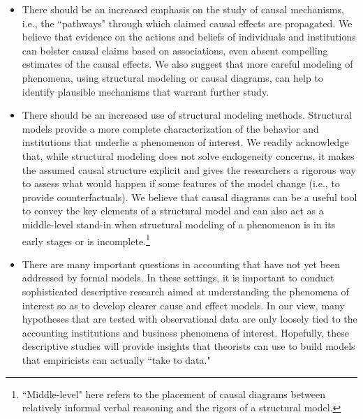 \documentclass[12pt,reqno,titlepage]{amsart}
\begin{document}
\begin{doublespace}
\begin{itemize}
\item There should be an increased emphasis on the study of causal mechanisms, i.e., the ``pathways" through which claimed causal effects are propagated.
We believe that evidence on the actions and beliefs of individuals and institutions can bolster causal claims based on associations, even absent compelling estimates of the causal effects.
We also suggest that more careful modeling of phenomena, using structural modeling or causal diagrams, can help to identify plausible mechanisms that warrant further study.
\item There should be an increased use of structural modeling methods. 
Structural models provide a more complete characterization of the behavior and institutions that underlie a phenomenon of interest.
We readily acknowledge that, while structural modeling does not solve endogeneity concerns, it makes the assumed causal structure explicit and gives the researchers a rigorous way to assess what would happen if some features of the model change (i.e., to provide counterfactuals).
We believe that causal diagrams can be a useful tool to convey the key elements of a structural model and can also act as a middle-level stand-in when structural modeling of a phenomenon is in its early stages or is incomplete.\footnote{``Middle-level" here refers to the placement of causal diagrams between relatively informal verbal reasoning and the rigors of a structural model.}
\item There are many important questions in accounting that have not yet been addressed by formal models.
	In these settings, it is important to conduct sophisticated descriptive research aimed at understanding the phenomena of interest so as to develop clearer cause and effect models.
	In our view, many hypotheses that are tested with observational data are only loosely tied to the accounting institutions and business phenomena of interest. 
	Hopefully, these descriptive studies will provide insights that theorists can use to build models that empiricists can actually ``take to data."
\end{itemize}


\end{doublespace}
\end{document}
